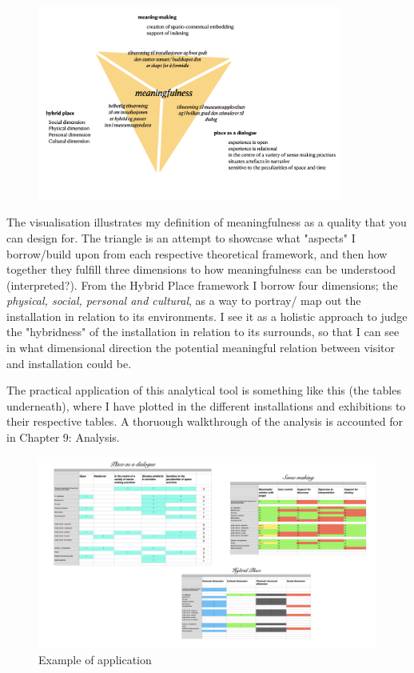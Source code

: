 \begin{figure}[h]
\includegraphics[width=10cm]{pictures/meaningfullness_triangle.png}
\centering 
\end{figure}

The visualisation illustrates my definition of meaningfulness as a quality that you can design for. The triangle is an attempt to showcase what "aspects" I borrow/build upon from each respective theoretical framework, and then how together they fulfill three dimensions to how meaningfulness can be understood (interpreted?).
From the Hybrid Place framework I borrow four dimensions; the \emph{physical, social, personal and cultural}, as a way to portray/ map out the installation in relation to its environments. I see it as a holistic approach to judge the "hybridness" of the installation in relation to its surrounds, so that I can see in what dimensional direction the potential meaningful relation between visitor and installation could be.

The practical application of this analytical tool is something like this (the tables underneath), where I have plotted in the different installations and exhibitions to their respective tables. A thoruough walkthrough of the analysis is accounted for in Chapter 9: Analysis.

\begin{figure}[H]
\includegraphics[width=25cm, angle=90]{pictures/dataset/analysis_tables.png}
\caption{Example of application}
\end{figure}

